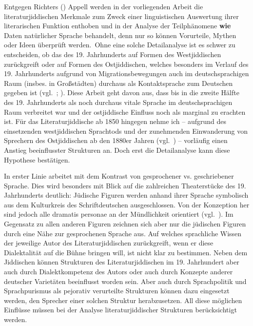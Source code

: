 \noindent Entgegen Richters (\citeyear[99]{Richter1995}) Appell werden in der vorliegenden Arbeit die literaturjiddischen Merkmale zum Zweck einer linguistischen Auswertung ihrer literarischen Funktion enthoben und in der Analyse der Teilphänomene \textbf{wie} Daten natürlicher Sprache behandelt, denn nur so können Vorurteile, Mythen oder Ideen überprüft werden.\, %
Ohne eine solche Detailanalyse ist es schwer zu entscheiden, ob das \hai{{\LiJi}} des 19. Jahrhunderts auf Formen des Westjiddischen zurückgreift oder auf Formen des Ostjiddischen, welches besonders im Verlauf des 19. Jahrhunderts aufgrund von Migrationsbewegungen auch im deutschsprachigen Raum (insbes. in Großstädten) durchaus als Kontaktsprache zum Deutschen gegeben ist (vgl.\, \citealt{Bertram1924,AdlerRudel1959,Maurer1986}; \citealt[229–239]{Gay1994}).\label{RueckgangWJimLiJi} Diese Arbeit geht davon aus, dass bis in die zweite Hälfte des 19. Jahrhunderts  als noch durchaus vitale Sprache im deutschsprachigen \,%
Raum verbreitet war und der ostjiddische Einfluss noch als marginal zu erachten ist. Für das Literaturjiddische ab 1850 hingegen nehme ich – aufgrund des einsetzenden westjiddischen Sprachtods und der zunehmenden Einwanderung von Sprechern des Ostjiddischen ab den 1880er Jahren (vgl.\, \citealt[229–239]{Gay1994}) – vorläufig einen Anstieg  beeinflusster Strukturen an. Doch erst die Detailanalyse kann diese Hypothese bestätigen.

 In erster Linie arbeitet  mit dem Kontrast von gesprochener vs. geschriebener Sprache. Dies wird besonders mit Blick auf die zahlreichen Theaterstücke des 19. Jahrhunderts deutlich: Jüdische Figuren werden anhand ihrer Sprache symbolisch aus dem Kulturkreis des Schriftdeutschen ausgeschlossen. Von der Konzeption her sind jedoch alle dramatis personae an der Mündlichkeit orientiert (vgl.\, \citealt{KochOesterreicher1985}). Im Gegensatz zu allen anderen Figuren zeichnen sich aber nur die jüdischen Figuren durch eine Nähe zur gesprochenen Sprache aus. Auf welches sprachliche Wissen der jeweilige Autor des Literaturjiddischen zurückgreift, wenn er diese Dialektalität auf die Bühne bringen will, ist nicht klar zu bestimmen. Neben dem Jiddischen können Strukturen des Literaturjiddischen im 19. Jahrhundert aber auch durch Dialektkompetenz des Autors oder auch durch Konzepte anderer deutscher Varietäten beeinflusst worden sein. Aber auch durch Sprachpolitik und Sprachpurismus als pejorativ verurteilte Strukturen können dazu eingesetzt werden, den Sprecher einer solchen Struktur herabzusetzen.  All diese möglichen Einflüsse müssen bei der Analyse literaturjiddischer Strukturen berücksichtigt werden.
 
